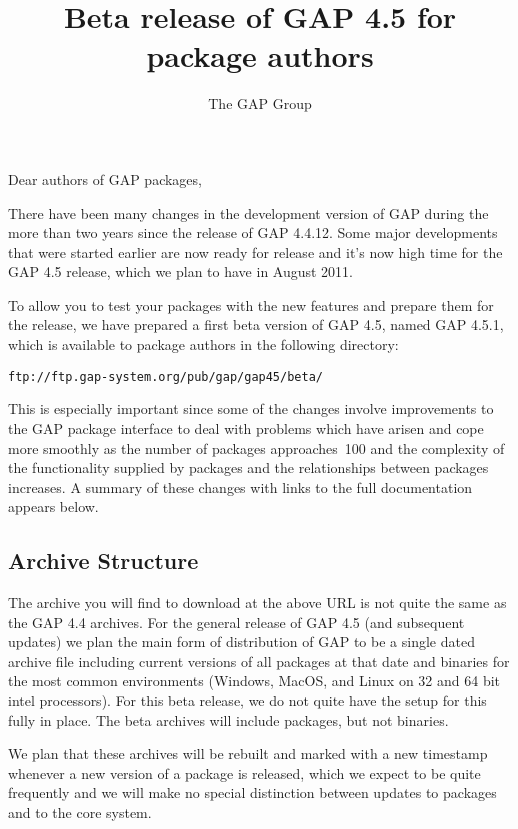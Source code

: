 \documentclass[10pt]{article}
\title{Beta release of GAP 4.5 for package authors}
\author{The GAP Group}
\def\releasemonth{August 2011}
\def\betaversion{4.5.1}
\newcommand{\todo}[1]{}%
\begin{document}
\maketitle

Dear authors of GAP packages,

There have been many changes in the development version of GAP during the more
than two years since the release of GAP 4.4.12. Some
major developments that were started earlier are now ready for release and it's
now high time for the GAP 4.5 release, which we plan to have in \releasemonth.

To allow you to test your packages with the new features and prepare them for the release, we have prepared a first beta version of GAP 4.5, named GAP \betaversion, which
is available to package authors in the following directory:

\begin{center}
\verb|ftp://ftp.gap-system.org/pub/gap/gap45/beta/|
\end{center}

This is especially important since some of the changes involve improvements to the GAP package interface to deal with problems which have arisen and 
cope more smoothly as the number of packages approaches~100 and the complexity of the functionality supplied by packages and the relationships between packages increases. 
A summary of these changes with links to the full documentation appears below.

\todo{Moving to a single archive, we wrap GAP 4.5 with packages
from the start. Need more thought about version numbers - may need
to reflect package binaries if statically compiled into the kernel.}

\subsection*{Archive Structure}

The archive you will find to download at the above URL is not quite the same as the GAP 4.4 archives. For the general release of GAP 4.5 (and subsequent updates) 
we plan the main form of distribution of GAP to be a single dated archive file including current versions of all packages 
at that date and binaries for the most common 
environments (Windows, MacOS, and Linux on 32 and 64 bit intel processors). For this beta release, we do not quite have the setup for this fully in place. 
The beta archives will include packages, but not binaries. 

We plan that these archives will be rebuilt and marked with a new timestamp
whenever a new version of a package is released, which we expect to be quite frequently 
and we will make no special distinction between 
updates to packages and to the core system.
\end{document}
